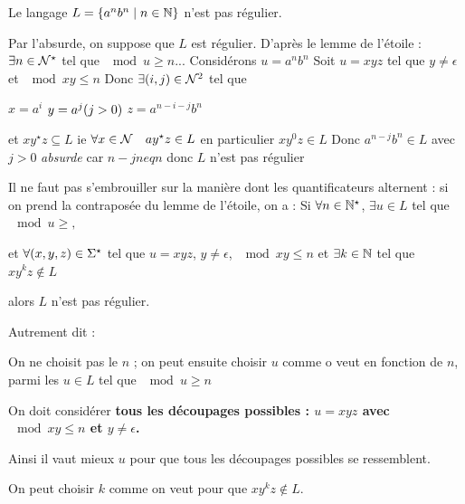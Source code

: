 \documentclass[a4paper,french,bookmarks]{book}
\begin{document}
    \begin{theorem}{}{}
        Le langage $L = \left\{a^n b^n \;\middle\vert\; n \in \mathbb{N}\right\}$ n'est pas régulier.
    \end{theorem}
    
    \begin{nproof}
        Par l'absurde, on suppose que $L$ est régulier. D'après le lemme de l'étoile : $\exists n \in \mathcal{N}^\star$ tel que $\mod{u} \geq n$...
        Considérons $u = a^n b^n$
        Soit $u = x y z$ tel que $y \neq \epsilon$ et $\mod{xy} \leq n$
        Donc $\exists  \!\left(i, j\right) \in \mathcal{N}^2$ tel que
        \begin{enumerate}
            \itt $x = a^i$
            \itt $y =a^j \!\left(j > 0\right)$
            \itt $z = a^{n-i-j} b^n$
        \end{enumerate}
        et $x y^\star z \subseteq L$
        ie $\forall x \in \mathcal{N} \quad a y^\star z \in L$ en particulier $x y^0 z \in L$
        Donc $a^{n-j} b^n \in L$
        avec $j>0$ \emph{absurde} car $n-j neq n$
        donc $L$ n'est pas régulier
    \end{nproof}
    
    \begin{warning}{}{}
        Il ne faut pas s'embrouiller sur la manière dont les quantificateurs alternent : si on prend la contraposée du lemme de l'étoile, on a :
        Si $\forall n \in \mathbb{N}^\star$, $\exists u \in L$ tel que $\mod{u} \geq ,$
        
        et $\forall \!\left(x, y, z\right) \in \Sigma^\star$ tel que $u = xyz$, $y \neq \epsilon$, $\mod{xy} \leq n$ et $\exists k \in \mathbb{N}$ tel que $xy^kz \not\in L$
        
        alors $L$ n'est pas régulier.
        
        Autrement dit :
        \begin{enumerate}
            \itt On ne choisit pas le $n$ ;
            \itt on peut ensuite choisir $u$ comme o veut en fonction de $n$, parmi les $u \in L$ tel que $\mod{u} \geq n$
            
            \itt On doit considérer \bf{tous} les découpages possibles :
            $u = xyz$ avec $\mod{xy} \leq n$ et $y \neq \epsilon$.
            
            Ainsi il vaut mieux  $u$ pour que tous les découpages possibles se ressemblent. 
            
            \itt On peut choisir $k$ comme on veut pour que $xy^kz \not\in L$.
        \end{enumerate}
    \end{warning}
    
\end{document}
